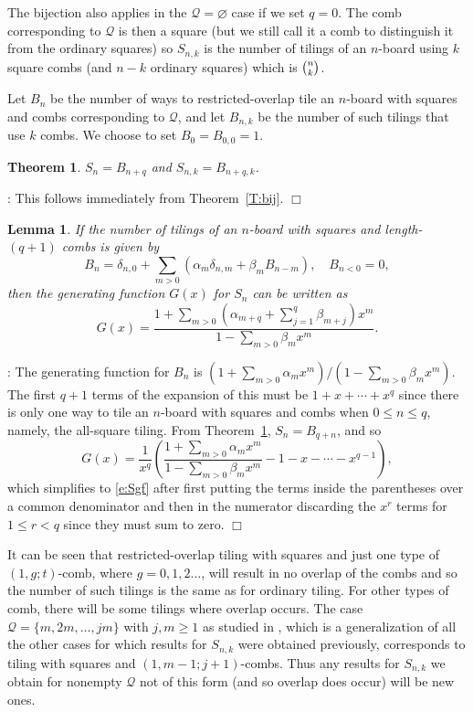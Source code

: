 \documentclass[preprint,3p]{elsarticle}
\newtheorem{thm}{Theorem}
\newtheorem{lem}{Lemma}
\newenvironment{proof}[1][]%
{\noindent\textit{\ifthenelse{\equal{#1}{}}{Proof}{Proof #1}}: }%
{\leavevmode\unskip\nobreak\quad\hspace*{\fill}$\Box$\par}
\begin{document}
The bijection also applies in the
$\mathcal{Q}=\varnothing$ case if we set $q=0$. The comb corresponding
to $\mathcal{Q}$ is then a square (but we still call it a comb to
distinguish it from the ordinary squares) so $S_{n,k}$ is the number
of tilings of an $n$-board using $k$ square combs (and $n-k$ ordinary
squares) which is $\tbinom{n}{k}$.

Let $B_n$ be the number of ways to restricted-overlap tile an
$n$-board with squares and combs corresponding to $\mathcal{Q}$, and
let $B_{n,k}$ be the number of such tilings that use $k$ combs. We
choose to set $B_0=B_{0,0}=1$.

\begin{thm}\label{T:S=B}
$S_n=B_{n+q}$ and $S_{n,k}=B_{n+q,k}$.
\end{thm}
\begin{proof}
This follows immediately from Theorem~\ref{T:bij}.
\end{proof}

\begin{lem}\label{L:gf} 
If the number of tilings of an $n$-board with squares and
length-$(q+1)$ combs is given by
\[ 
B_n=\delta_{n,0}+\sum_{m>0}(\alpha_m\delta_{n,m}+\beta_mB_{n-m}),
\quad B_{n<0}=0,
\]
 then the
generating function $G(x)$ for $S_n$ can be written as
\begin{equation}\label{e:Sgf} 
G(x)=\dfrac{1+\sum_{m>0}\left(\alpha_{m+q}+\sum_{j=1}^q\beta_{m+j}\right)x^m}
{1-\sum_{m>0}\beta_mx^m}.
\end{equation} 
\end{lem}
\begin{proof}
The generating function for $B_n$ is
$(1+\sum_{m>0}\alpha_mx^m)/(1-\sum_{m>0}\beta_mx^m)$. The first $q+1$
terms of the expansion of this must be $1+x+\cdots+x^q$ since there
is only one way to tile an $n$-board with squares and combs when
$0\leq n\leq q$, namely, the all-square tiling. From
Theorem~\ref{T:S=B}, $S_n=B_{q+n}$, and so
\[
G(x)=\frac1{x^q}
\left(\dfrac{1+\sum_{m>0}\alpha_mx^m}{1-\sum_{m>0}\beta_mx^m}
-1-x-\cdots-x^{q-1}
\right),
\]
which simplifies to \eqref{e:Sgf} after first putting the terms inside
the parentheses over a common denominator and then in the numerator
discarding the $x^r$ terms for $1\leq r<q$ since they must sum to
zero.
\end{proof}

It can be seen that restricted-overlap tiling with squares and just
one type of $(1,g;t)$-comb, where $g=0,1,2\ldots$, will result in no
overlap of the combs and so the number of such tilings is the same as
for ordinary tiling. For other types of comb, there will be some
tilings where overlap occurs. The case
$\mathcal{Q}=\{m,2m,\ldots,jm\}$ with $j,m\geq 1$ as studied in
\cite{MS08,All22}, which is a generalization of all the
other cases for which results for $S_{n,k}$ were obtained previously,
corresponds to tiling with squares and $(1,m-1;j+1)$-combs. Thus any
results for $S_{n,k}$ we obtain for nonempty $\mathcal{Q}$ not of this form
(and so overlap does occur) will be new ones.
\end{document}
